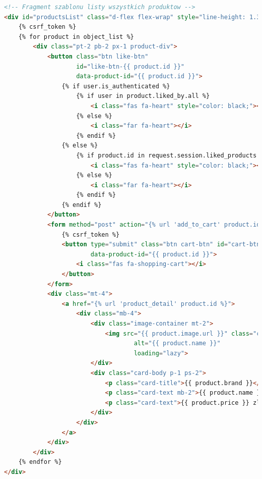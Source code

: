\documentclass[12pt,a4paper,oneside]{article}
\theoremstyle{definition}
\numberwithin{equation}{section}
\begin{document}
\begin{itemize}
        \begin{lstlisting}[language=HTML, caption=Szablon all\_products.html]
<!-- Fragment szablonu listy wszystkich produktow -->
<div id="productsList" class="d-flex flex-wrap" style="line-height: 1.3;">
    {% csrf_token %}
    {% for product in object_list %}
        <div class="pt-2 pb-2 px-1 product-div">
            <button class="btn like-btn"
                    id="like-btn-{{ product.id }}"
                    data-product-id="{{ product.id }}">
                {% if user.is_authenticated %}
                    {% if user in product.liked_by.all %}
                        <i class="fas fa-heart" style="color: black;"></i>
                    {% else %}
                        <i class="far fa-heart"></i>
                    {% endif %}
                {% else %}
                    {% if product.id in request.session.liked_products %}
                        <i class="fas fa-heart" style="color: black;"></i>
                    {% else %}
                        <i class="far fa-heart"></i>
                    {% endif %}
                {% endif %}
            </button>
            <form method="post" action="{% url 'add_to_cart' product.id %}" class="d-inline">
                {% csrf_token %}
                <button type="submit" class="btn cart-btn" id="cart-btn-{{ product.id }}"
                        data-product-id="{{ product.id }}">
                    <i class="fas fa-shopping-cart"></i>
                </button>
            </form>
            <div class="mt-4">
                <a href="{% url 'product_detail' product.id %}">
                    <div class="mb-4">
                        <div class="image-container mt-2">
                            <img src="{{ product.image.url }}" class="card-img-top"
                                    alt="{{ product.name }}"
                                    loading="lazy">
                        </div>
                        <div class="card-body p-1 ps-2">
                            <p class="card-title">{{ product.brand }}</p>
                            <p class="card-text mb-2">{{ product.name }}</p>
                            <p class="card-text">{{ product.price }} zl</p>
                        </div>
                    </div>
                </a>
            </div>
        </div>
    {% endfor %}
</div>
            \end{lstlisting}
\end{itemize}
\end{document}
